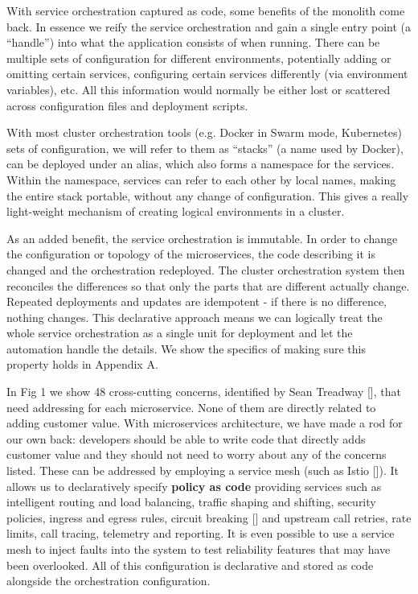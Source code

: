 \documentclass[reprint,amsmath,amssymb,aps]{revtex4-1}
\begin{document}
With service orchestration captured as code, some benefits of the monolith come back. In essence we reify the service orchestration and gain a single entry point (a “handle”) into what the application consists of when running. There can be multiple sets of configuration for different environments, potentially adding or omitting certain services, configuring certain services differently (via environment variables), etc. All this information would normally be either lost or scattered across configuration files and deployment scripts.

With most cluster orchestration tools (e.g. Docker in Swarm mode, Kubernetes) sets of configuration, we will refer to them as “stacks” (a name used by Docker), can be deployed under an alias, which also forms a namespace for the services. Within the namespace, services can refer to each other by local names, making the entire stack portable, without any change of configuration. This gives a really light-weight mechanism of creating logical environments in a cluster.

As an added benefit, the service orchestration is immutable. In order to change the configuration or topology of the microservices, the code describing it is changed and the orchestration redeployed. The cluster orchestration system then reconciles the differences so that only the parts that are different actually change. Repeated deployments and updates are idempotent - if there is no difference, nothing changes. This declarative approach means we can logically treat the whole service orchestration as a single unit for deployment and let the automation handle the details. We show the specifics of making sure this property holds in Appendix A.

In Fig 1 we show 48 cross-cutting concerns, identified by Sean Treadway [], that need addressing for each microservice. None of them are directly related to adding customer value. With microservices architecture, we have made a rod for our own back: developers should be able to write code that directly adds customer value and they should not need to worry about any of the concerns listed. These can be addressed by employing a service mesh (such as Istio []). It allows us to declaratively specify \textbf{policy as code} providing services such as intelligent routing and load balancing, traffic shaping and shifting, security policies, ingress and egress rules, circuit breaking [] and upstream call retries, rate limits, call tracing, telemetry and reporting. It is even possible to use a service mesh to inject faults into the system to test reliability features that may have been overlooked. All of this configuration is declarative and stored as code alongside the orchestration configuration.
\end{document}
